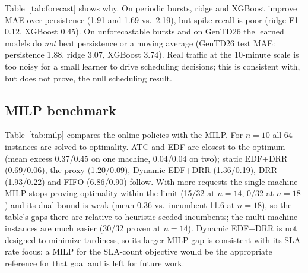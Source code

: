 \documentclass[conference]{IEEEtran}
\begin{document}
\begin{table}[t]
\caption{Forecast accuracy on the chronological test split (spike = $>\mu+2\sigma$ of six preceding windows).}
\label{tab:forecast}
\centering\scriptsize

\end{table}

Table~\ref{tab:forecast} shows why. On periodic bursts, ridge and XGBoost improve MAE over persistence (1.91 and 1.69 vs.\ 2.19), but spike recall is poor (ridge F1 0.12, XGBoost 0.45). On unforecastable bursts and on GenTD26 the learned models do \emph{not} beat persistence or a moving average (GenTD26 test MAE: persistence 1.88, ridge 3.07, XGBoost 3.74). Real traffic at the 10-minute scale is too noisy for a small learner to drive scheduling decisions; this is consistent with, but does not prove, the null scheduling result.

\subsection{MILP benchmark}

\begin{table}[t]
\caption{Mean excess weighted tardiness over the MILP incumbent (32 congested instances per row; $n$ requests, $m$ machines; 30 s limit). ``Opt./inst.'': instances with proven optimality. Where optimality is not proven the incumbent is at most the best heuristic, so gaps are \emph{lower bounds} on the true gap.}
\label{tab:milp}
\centering\scriptsize

\end{table}

Table~\ref{tab:milp} compares the online policies with the MILP. For $n=10$ all 64 instances are solved to optimality. ATC and EDF are closest to the optimum (mean excess 0.37/0.45 on one machine, 0.04/0.04 on two); static EDF+DRR (0.69/0.06), the proxy (1.20/0.09), Dynamic EDF+DRR (1.36/0.19), DRR (1.93/0.22) and FIFO (6.86/0.90) follow. With more requests the single-machine MILP stops proving optimality within the limit (15/32 at $n=14$, 0/32 at $n=18$) and its dual bound is weak (mean 0.36 vs.\ incumbent 11.6 at $n=18$), so the table's gaps there are relative to heuristic-seeded incumbents; the multi-machine instances are much easier (30/32 proven at $n=14$). Dynamic EDF+DRR is not designed to minimize tardiness, so its larger MILP gap is consistent with its SLA-rate focus; a MILP for the SLA-count objective would be the appropriate reference for that goal and is left for future work.
\end{document}
